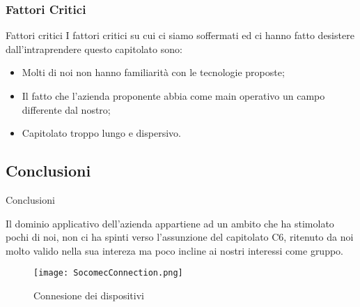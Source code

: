 \documentclass[11pt]{article}
\begin{document}
    \subsubsection{Fattori Critici} Fattori critici
    I fattori critici su cui ci siamo soffermati ed ci hanno fatto desistere dall'intraprendere questo capitolato sono:
    \begin{itemize}
            \item Molti di noi non hanno familiarità con le tecnologie proposte;
            \item Il fatto che l'azienda proponente abbia come main operativo un campo differente dal nostro; 
            \item Capitolato troppo lungo e dispersivo.
        \end{itemize}
    \subsection{Conclusioni} Conclusioni
    
    Il dominio applicativo dell'azienda appartiene ad un ambito che ha stimolato pochi di noi, non ci ha spinti verso l'assunzione del capitolato C6, ritenuto da noi molto valido nella sua intereza ma poco incline ai nostri interessi come gruppo.
    
    \begin{figure}[h!]
        \centering
        \texttt{[image: SocomecConnection.png]}
        \caption{Connesione dei dispositivi}
        \label{socom}
    \end{figure}
\end{document}
